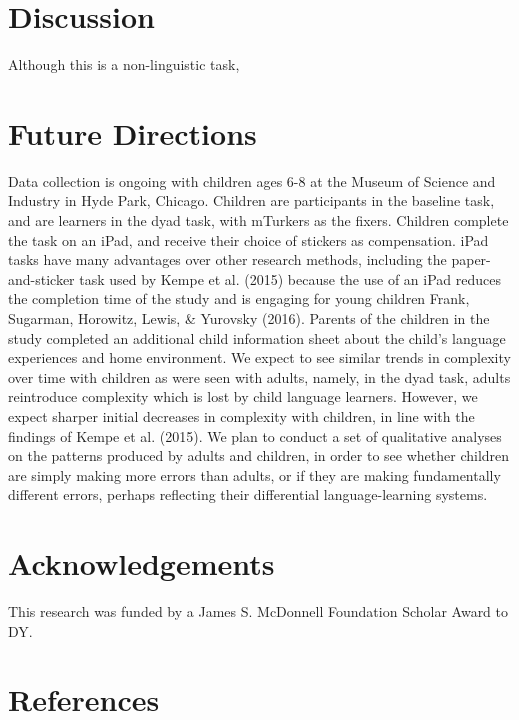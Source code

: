 \documentclass[10pt, letterpaper]{article}
\begin{document}
\section{Discussion}\label{discussion}

Although this is a non-linguistic task,

\section{Future Directions}\label{future-directions}

Data collection is ongoing with children ages 6-8 at the Museum of
Science and Industry in Hyde Park, Chicago. Children are participants in
the baseline task, and are learners in the dyad task, with mTurkers as
the fixers. Children complete the task on an iPad, and receive their
choice of stickers as compensation. iPad tasks have many advantages over
other research methods, including the paper-and-sticker task used by
Kempe et al. (2015) because the use of an iPad reduces the completion
time of the study and is engaging for young children Frank, Sugarman,
Horowitz, Lewis, \& Yurovsky (2016). Parents of the children in the
study completed an additional child information sheet about the child's
language experiences and home environment. We expect to see similar
trends in complexity over time with children as were seen with adults,
namely, in the dyad task, adults reintroduce complexity which is lost by
child language learners. However, we expect sharper initial decreases in
complexity with children, in line with the findings of Kempe et al.
(2015). We plan to conduct a set of qualitative analyses on the patterns
produced by adults and children, in order to see whether children are
simply making more errors than adults, or if they are making
fundamentally different errors, perhaps reflecting their differential
language-learning systems.

\vspace{1em}

\section{Acknowledgements}\label{acknowledgements}

This research was funded by a James S. McDonnell Foundation Scholar
Award to DY.

\section{References}\label{references}
\end{document}
